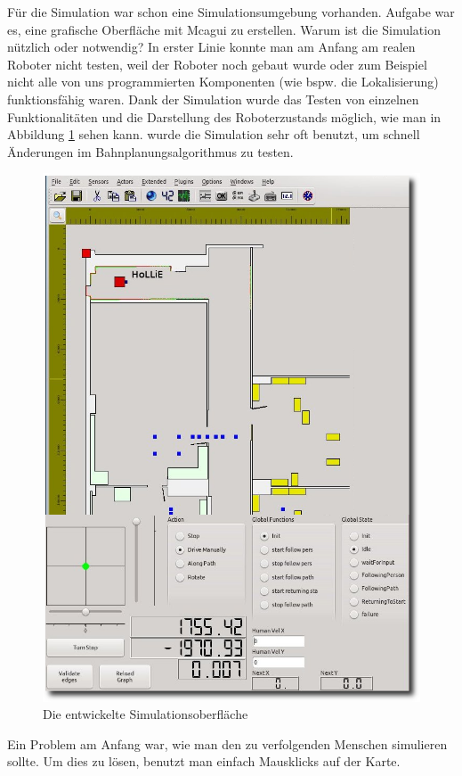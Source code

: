 Für die Simulation war schon eine Simulationsumgebung vorhanden.
Aufgabe war es, eine grafische Oberfläche mit Mcagui zu erstellen.
Warum ist die Simulation nützlich oder notwendig?
In erster Linie konnte man am Anfang am realen Roboter nicht testen, weil der Roboter noch gebaut wurde oder zum Beispiel nicht alle von uns programmierten Komponenten (wie bspw. die Lokalisierung) funktionsfähig waren.
Dank der Simulation wurde das Testen von einzelnen Funktionalitäten und die Darstellung des Roboterzustands möglich, wie man in Abbildung \ref{fig:mcagui} sehen kann.
\ZB wurde die Simulation sehr oft benutzt, um schnell Änderungen im Bahnplanungsalgorithmus zu testen.

\begin{figure}[h]
\centering
\includegraphics[scale=0.4]{graphics/mcagui_screenshot.png}		
\caption{\label{fig:mcagui} Die entwickelte Simulationsoberfläche
}
\end{figure}

Ein Problem am Anfang war, wie man den zu verfolgenden Menschen simulieren sollte.
Um dies zu lösen, benutzt man einfach Mausklicks auf der Karte.

